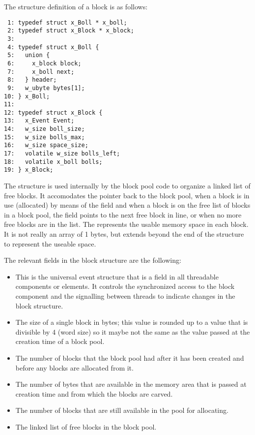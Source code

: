 The structure definition of a block is as follows:

\bcode
\begin{verbatim}
 1: typedef struct x_Boll * x_boll;
 2: typedef struct x_Block * x_block;
 3:
 4: typedef struct x_Boll {
 5:   union {
 6:     x_block block;
 7:     x_boll next;
 8:   } header;
 9:   w_ubyte bytes[1];
10: } x_Boll;
11:
12: typedef struct x_Block {
13:   x_Event Event;
14:   w_size boll_size;
15:   w_size bolls_max;
16:   w_size space_size;
17:   volatile w_size bolls_left;
18:   volatile x_boll bolls;
19: } x_Block;
\end{verbatim}
\ecode

The  structure is used internally by the block pool code to
organize a linked list of free blocks. It accomodates the pointer back to
the block pool, when a block is in use (allocated) by means of the
 field and when a block is on the
free list of blocks in a block pool, the field
 points to the next free block in
line, or  when no more free blocks are in the list. The
 represents the usable memory space in
each block. It is not really an array of 1 bytes, but extends beyond the end
of the structure to represent the useable space.

The relevant fields in the block structure are the following:

\begin{itemize}
\item {} This is the universal event structure that is a field
in all threadable components or elements. It controls the synchronized access
to the block component and the signalling between threads to indicate changes
in the block structure.
\item {} The size of a single block in
bytes; this value is rounded up to a value that is divisible by 4 (word
size) so it maybe not the same as the value passed at the creation time of a
block pool.
\item {} The number of blocks that the
block pool had after it has been created and before any blocks are allocated
from it.
\item {} The number of bytes that are
available in the memory area that is passed at creation time and from which
the blocks are carved.
\item {} The number of blocks that
are still available in the pool for allocating.
\item {} The linked list of free blocks in
the block pool.
\end{itemize}

